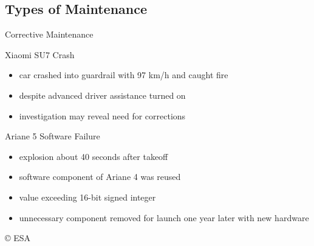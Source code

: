 \subsection{Types of Maintenance}
\begin{frame}{Corrective Maintenance}
	\begin{fancycolumns}
		\begin{definition}{\insertsubsection\mysource{\lientzswanson}}
			 \hfill {}
		\end{definition}
		\begin{example}{Xiaomi SU7 Crash}
			\begin{itemize}
				\item car crashed into guardrail with 97 km/h and caught fire
				\item despite advanced driver assistance turned on
				\item investigation may reveal need for corrections
			\end{itemize}
			\centering{}
		\end{example}
		\nextcolumn
		\begin{example}{Ariane 5 Software Failure}
			\begin{itemize}
				\item explosion about 40 seconds after takeoff
				\item software component of Ariane 4 was reused
				\item value exceeding 16-bit signed integer
				\item unnecessary component removed for launch one year later with new hardware
			\end{itemize}
			\centering{} {\tiny\copyright{} ESA} %
		\end{example}
	\end{fancycolumns}
\end{frame}

